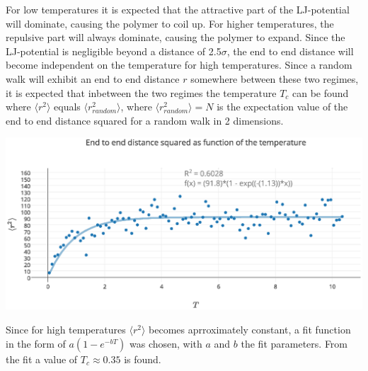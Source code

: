 For low temperatures it is expected that the attractive part of the LJ-potential will dominate, causing the polymer to coil up. For higher temperatures, the repulsive part will always dominate, causing the polymer to expand. Since the LJ-potential is negligible beyond a distance of 2.5$\sigma$, the end to end distance will become independent on the temperature for high temperatures. Since a random walk will exhibit an end to end distance $r$ somewhere between these two regimes, it is expected that inbetween the two regimes the temperature $T_c$ can be found where $\langle r^2 \rangle$ equals $\langle r_{random}^2 \rangle$, where $\langle r_{random}^2 \rangle = N$ is the expectation value of the end to end distance squared for a random walk in 2 dimensions.
\begin{Figure}
  \centerfloat
     \includegraphics[scale=0.4]{end_to_end_distance_squared_as_function_of_the_temperature.eps}
 \label{fig:end_to_end_afo_temperature}
\end{Figure}

Since for high temperatures $\langle r^2 \rangle$ becomes aprroximately constant, a fit function in the form of $a(1-e^{-bT})$ was chosen, with $a$ and $b$ the fit parameters. From the fit a value of $T_c \approx 0.35$ is found.
